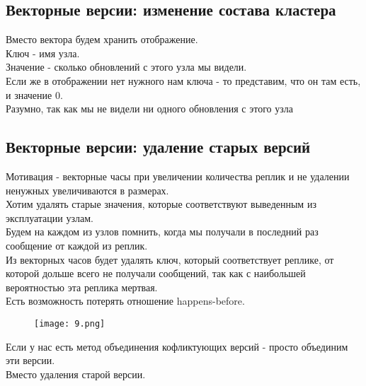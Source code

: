 \subsection{Векторные версии: изменение состава кластера}
Вместо вектора будем хранить отображение.\\
Ключ - имя узла.\\
Значение - сколько обновлений с этого узла мы видели.\\
Если же в отображении нет нужного нам ключа - то представим, что он там есть, и значение $0$.\\
Разумно, так как мы не видели ни одного обновления с этого узла
\subsection{Векторные версии: удаление старых версий}
Мотивация - векторные часы при увеличении количества реплик и не удалении ненужных увеличиваются в размерах.\\
Хотим удалять старые значения, которые соответствуют выведенным из эксплуатации узлам.\\
Будем на каждом из узлов помнить, когда мы получали в последний раз сообщение от каждой из реплик.\\
Из векторных часов будет удалять ключ, который соответствует реплике, от которой дольше всего не получали сообщений, так как с наибольшей вероятностью эта реплика мертвая.\\
Есть возможность потерять отношение happens-before.\\
\begin{figure}[h]
    \centering
    \texttt{[image: 9.png]}
    \caption{}
\end{figure}
Если у нас есть метод объединения кофликтующих версий - просто объединим эти версии.\\
Вместо удаления старой версии.
